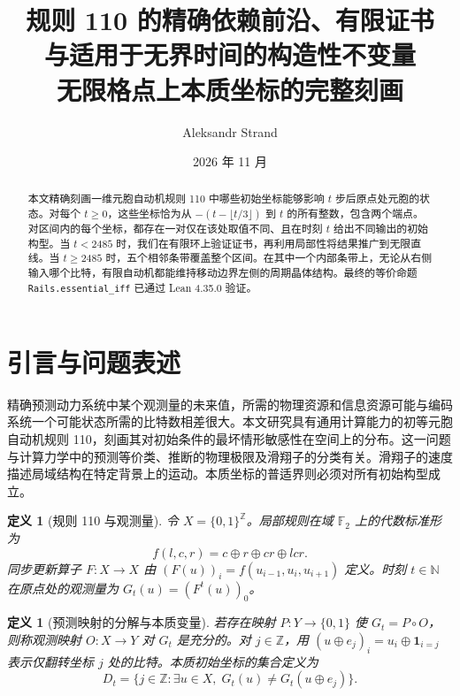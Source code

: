 \documentclass[11pt, a4paper]{article}
\title{\vspace{-1cm}\textbf{\Large 规则 110 的精确依赖前沿、有限证书\\与适用于无界时间的构造性不变量}\\[0.55em]
{\large 无限格点上本质坐标的完整刻画}}
\author{Aleksandr Strand}
\date{2026 年 11 月}
\newtheorem{definition}[theorem]{定义}
\begin{document}
\sloppy
\maketitle
\thispagestyle{plain}

\begin{abstract}
本文精确刻画一维元胞自动机规则 110 中哪些初始坐标能够影响 $t$ 步后原点处元胞的状态。对每个 $t\ge0$，这些坐标恰为从 $-(t-\lfloor t/3\rfloor)$ 到 $t$ 的所有整数，包含两个端点。对区间内的每个坐标，都存在一对仅在该处取值不同、且在时刻 $t$ 给出不同输出的初始构型。当 $t<2485$ 时，我们在有限环上验证证书，再利用局部性将结果推广到无限直线。当 $t\ge2485$ 时，五个相邻条带覆盖整个区间。在其中一个内部条带上，无论从右侧输入哪个比特，有限自动机都能维持移动边界左侧的周期晶体结构。最终的等价命题 \texttt{Rails.essential\_iff} 已通过 Lean 4.35.0 验证。
\end{abstract}

\tableofcontents
\vspace{1em}

\section{引言与问题表述}

精确预测动力系统中某个观测量的未来值，所需的物理资源和信息资源可能与编码系统一个可能状态所需的比特数相差很大。本文研究具有通用计算能力的初等元胞自动机规则 110\cite{cook2004}，刻画其对初始条件的最坏情形敏感性在空间上的分布。这一问题与计算力学中的预测等价类\cite{shalizi2001}、推断的物理极限\cite{wolpert2008}及滑翔子的分类\cite{wolfram1986, martinez2006}有关。滑翔子的速度描述局域结构在特定背景上的运动。本质坐标的普适界则必须对所有初始构型成立。

\begin{definition}[规则 110 与观测量]
令 $X = \{0, 1\}^{\mathbb{Z}}$。局部规则在域 $\mathbb{F}_2$ 上的代数标准形为
\begin{equation}\label{eq:rule110}
f(l, c, r) = c \oplus r \oplus cr \oplus lcr.
\end{equation}
同步更新算子 $F : X \to X$ 由 $(F(u))_i = f(u_{i-1}, u_i, u_{i+1})$ 定义。时刻 $t \in \mathbb{N}$ 在原点处的观测量为 $G_t(u) = (F^t(u))_0$。
\end{definition}

\begin{definition}[预测映射的分解与本质变量]
若存在映射 $P : Y \to \{0, 1\}$ 使 $G_t = P \circ O$，则称观测映射 $O : X \to Y$ 对 $G_t$ 是充分的。对 $j \in \mathbb{Z}$，用 $(u \oplus e_j)_i = u_i \oplus \mathbf{1}_{i=j}$ 表示仅翻转坐标 $j$ 处的比特。本质初始坐标的集合定义为
\begin{equation}\label{eq:essential_set}
D_t = \{ j \in \mathbb{Z} : \exists u \in X,\; G_t(u) \ne G_t(u \oplus e_j) \}.
\end{equation}
\end{definition}
\end{document}
